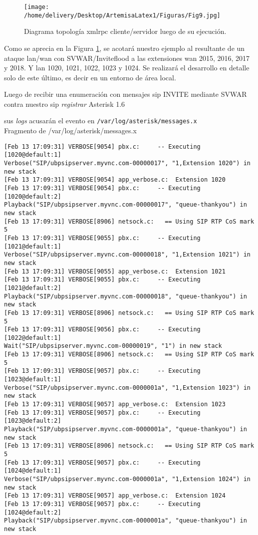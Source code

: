 \documentclass[a4paper,12pt]{report}
\newenvironment{myscriptlisting}
{\begin{list}{}{\setlength{\leftmargin}{1em}}\item\scriptsize\bfseries}
{\end{list}}
\begin{document}
{\newpage

\begin{figure}[h!] 
\centering
\texttt{[image: /home/delivery/Desktop/ArtemisaLatex1/Figuras/Fig9.jpg]}
\caption{Diagrama topología \ac{xmlrpc} cliente/servidor luego de su ejecución.}
\label{api_xmlrpc_execution}
\end{figure}

Como se aprecia en la Figura \ref{api_xmlrpc_execution}, se acotará nuestro ejemplo al
resultante de un ataque \ac{lan}/\ac{wan} con SVWAR/Inviteflood a las extensiones \ac{wan}
2015, 2016, 2017 y 2018. Y \ac{lan} 1020, 1021, 1022, 1023 y 1024. Se realizará el
desarrollo en detalle solo de este último, es decir en un entorno de área local.

Luego de recibir una enumeración con mensajes \ac{sip} INVITE mediante SVWAR
contra nuestro \ac{sip} \emph{registrar} Asterisk 1.6} sus
\emph{logs} acusarán el evento en \texttt{/var/log/asterisk\-/messages.x}\\

Fragmento de /var/log/asterisk/messages.x
\begin{myscriptlisting}   
  \begin{verbatim}
[Feb 13 17:09:31] VERBOSE[9054] pbx.c:     -- Executing [1020@default:1]
Verbose("SIP/ubpsipserver.myvnc.com-00000017", "1,Extension 1020") in new stack
[Feb 13 17:09:31] VERBOSE[9054] app_verbose.c:  Extension 1020
[Feb 13 17:09:31] VERBOSE[9054] pbx.c:     -- Executing [1020@default:2]
Playback("SIP/ubpsipserver.myvnc.com-00000017", "queue-thankyou") in new stack
[Feb 13 17:09:31] VERBOSE[8906] netsock.c:   == Using SIP RTP CoS mark 5
[Feb 13 17:09:31] VERBOSE[9055] pbx.c:     -- Executing [1021@default:1]
Verbose("SIP/ubpsipserver.myvnc.com-00000018", "1,Extension 1021") in new stack
[Feb 13 17:09:31] VERBOSE[9055] app_verbose.c:  Extension 1021
[Feb 13 17:09:31] VERBOSE[9055] pbx.c:     -- Executing [1021@default:2]
Playback("SIP/ubpsipserver.myvnc.com-00000018", "queue-thankyou") in new stack
[Feb 13 17:09:31] VERBOSE[8906] netsock.c:   == Using SIP RTP CoS mark 5
[Feb 13 17:09:31] VERBOSE[9056] pbx.c:     -- Executing [1022@default:1]
Wait("SIP/ubpsipserver.myvnc.com-00000019", "1") in new stack
[Feb 13 17:09:31] VERBOSE[8906] netsock.c:   == Using SIP RTP CoS mark 5
[Feb 13 17:09:31] VERBOSE[9057] pbx.c:     -- Executing [1023@default:1]
Verbose("SIP/ubpsipserver.myvnc.com-0000001a", "1,Extension 1023") in new stack
[Feb 13 17:09:31] VERBOSE[9057] app_verbose.c:  Extension 1023
[Feb 13 17:09:31] VERBOSE[9057] pbx.c:     -- Executing [1023@default:2]
Playback("SIP/ubpsipserver.myvnc.com-0000001a", "queue-thankyou") in new stack
[Feb 13 17:09:31] VERBOSE[8906] netsock.c:   == Using SIP RTP CoS mark 5
[Feb 13 17:09:31] VERBOSE[9057] pbx.c:     -- Executing [1024@default:1]
Verbose("SIP/ubpsipserver.myvnc.com-0000001a", "1,Extension 1024") in new stack
[Feb 13 17:09:31] VERBOSE[9057] app_verbose.c:  Extension 1024
[Feb 13 17:09:31] VERBOSE[9057] pbx.c:     -- Executing [1024@default:2]
Playback("SIP/ubpsipserver.myvnc.com-0000001a", "queue-thankyou") in new stack
  \end{verbatim}
\end{myscriptlisting}
\end{document}
